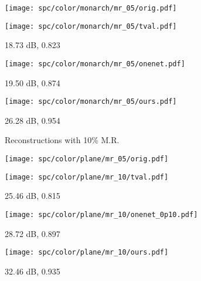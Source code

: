 \documentclass[journal,twoside]{IEEEtran}
\begin{document}
\begin{figure*}[t]
\begin{minipage}{.98\textwidth}
\begin{minipage}{.20\textwidth}
\vspace{0.04cm}
\texttt{[image: spc/color/monarch/mr\_05/orig.pdf]}  
\centerline{}
\end{minipage}\hspace{0.1cm}
\begin{minipage}{.20\textwidth}
\vspace{0.04cm}
\texttt{[image: spc/color/monarch/mr\_05/tval.pdf]}  
\centerline{ 18.73 dB, 0.823}
\end{minipage}\hspace{0.1cm}
\begin{minipage}{.20\textwidth}
\vspace{0.1cm}
\texttt{[image: spc/color/monarch/mr\_05/onenet.pdf]}  
\centerline{ 19.50 dB, 0.874}
\end{minipage}\hspace{0.1cm}
\begin{minipage}{.20\textwidth}
\vspace{0.1cm}
\texttt{[image: spc/color/monarch/mr\_05/ours.pdf]}  
\centerline{ 26.28 dB, 0.954}
\end{minipage}
\end{minipage}

\centerline{}
\centerline{}

\begin{minipage}{.01\textwidth}
\raggedleft
\begin{turn}{90}Reconstructions with 10\% M.R. \end{turn}
\end{minipage}
\begin{minipage}{.98\textwidth}
\centering
\begin{minipage}{.20\textwidth}
\vspace{0.01cm}
\texttt{[image: spc/color/plane/mr\_05/orig.pdf]}  
\centerline{}
\end{minipage}\hspace{0.1cm}
\begin{minipage}{.20\textwidth}
\vspace{0.01cm}
\texttt{[image: spc/color/plane/mr\_10/tval.pdf]}  
\centerline{ 25.46 dB, 0.815}
\end{minipage}\hspace{0.1cm}
\begin{minipage}{.20\textwidth}
\vspace{0.1cm}
\texttt{[image: spc/color/plane/mr\_10/onenet\_0p10.pdf]}  
\centerline{28.72 dB, 0.897}
\end{minipage}\hspace{0.1cm}
\begin{minipage}{.20\textwidth}
\vspace{0.1cm}
\texttt{[image: spc/color/plane/mr\_10/ours.pdf]}  
\centerline{ 32.46 dB, 0.935}
\end{minipage}


\end{minipage}
\end{figure*}
\end{document}
